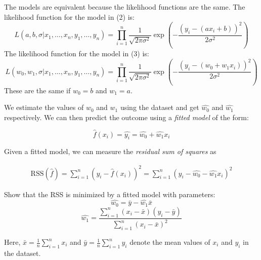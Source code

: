 \documentclass{article}
\begin{document}
\begin{probset}
\begin{prob}
\begin{subprobset}
\begin{subprob}
        \begin{soln}
            The models are equivalent because the likelihood functions are the same. The likelihood function for the model in (2) is:
            \[ L(a,b,\sigma | x_1, \dots, x_n, y_1, \dots, y_n) = \prod_{i=1}^n \frac{1}{\sqrt{2\pi\sigma^2}} \exp\left(-\frac{(y_i - (a x_i + b))^2}{2\sigma^2}\right) \]
            The likelihood function for the model in (3) is:
            \[ L(w_0,w_1,\sigma | x_1, \dots, x_n, y_1, \dots, y_n) = \prod_{i=1}^n \frac{1}{\sqrt{2\pi\sigma^2}} \exp\left(-\frac{(y_i - (w_0 + w_1 x_i))^2}{2\sigma^2}\right) \]
            These are the same if $w_0 = b$ and $w_1 = a$.
        \end{soln}
    \end{subprob}

    We estimate the values of $w_0$ and $w_1$ using the dataset and get $\hat{w_0}$ and $\hat{w_1}$ respectively. We can then predict the outcome using a \textit{fitted model} of the form:

    \[ \hat{f} (x_i) = \hat{y_i} = \hat{w_0} + \hat{w_1} x_i \]

    Given a fitted model, we can measure the \textit{residual sum of squares} as

    \begin{align}
        \text{RSS}( \hat{f} ) = \sum_{i=1}^n (y_i - \hat{f}(x_i))^2 =
        \sum_{i=1}^n (y_i - \hat{w_0} - \hat{w_1} x_i)^2
    \end{align}

    \newpage

    \begin{subprob}
        Show that the RSS is minimized by a fitted model with parameters:
        \[ \hat{w_0} =  \bar{y} - \hat{w_1}  \bar{x}\]
        \[ \hat{w_1} = \frac{\sum_{i=1}^n (x_i - \bar{x})(y_i - \bar{y})}{\sum_{i=1}^n (x_i - \bar{x})^2}\]

        Here, $\bar{x} = \frac{1}{n} \sum_{i=1}^n x_i$ and $\bar{y} = \frac{1}{n} \sum_{i=1}^n y_i$ denote the mean values of $x_i$ and $y_i$ in the dataset.


\end{subprob}
\end{subprobset}
\end{prob}
\end{probset}
\end{document}
